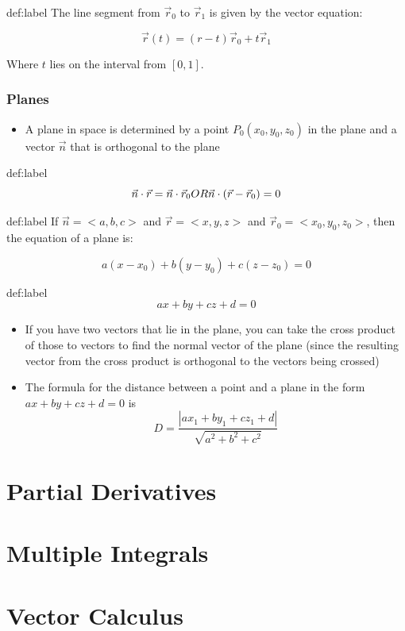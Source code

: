 \documentclass{package/notes}
\begin{document}
	\begin{definition}{def:label}
		The line segment from $\vec r_0$ to $\vec r_1$ is given by the vector equation:

		$$\vec r(t) = (r-t)\vec r_0 + t\vec r_1$$

		Where $t$ lies on the interval from $[0,1]$.
	\end{definition} %

\subsection{Planes}

	\begin{itemize}
		\item A plane in space is determined by a point $P_0(x_0,y_0,z_0)$ in the plane and a vector $\vec n$ that is orthogonal to the plane
	\end{itemize}

	\begin{definition}{def:label}
		$$
		\vec n \cdot \vec r = \vec n \cdot \vec r_0\\
		OR\\
		\vec n \cdot (\vec r - \vec r_0) = 0
		$$
	\end{definition} %

	\begin{definition}{def:label}
		If $\vec n = <a,b,c>$ and $\vec r = <x,y,z>$ and $\vec r_0 = <x_0,y_0,z_0>$, then the equation  of a plane is:

		$$a(x-x_0) +b(y-y_0)+c(z-z_0) = 0$$
	\end{definition}

	\begin{definition}{def:label}
		$$ax +by+cz+d=0$$
	\end{definition}

	\begin{itemize}
		\item If you have two vectors that lie in the plane, you can take the cross product of those to vectors to find the normal vector of the plane (since the resulting vector from the cross product is orthogonal to 	the vectors being crossed)
		\item The formula for the distance between a point and a plane in the form $ax+by+cz+d=0$ is 
		$$
		D = \frac{|ax_1+by_1+cz_1+d|}{\sqrt{a^2+b^2+c^2}}
		$$
	\end{itemize}



\chapter{Partial Derivatives}



\chapter{Multiple Integrals}



\chapter{Vector Calculus}
\end{document}
